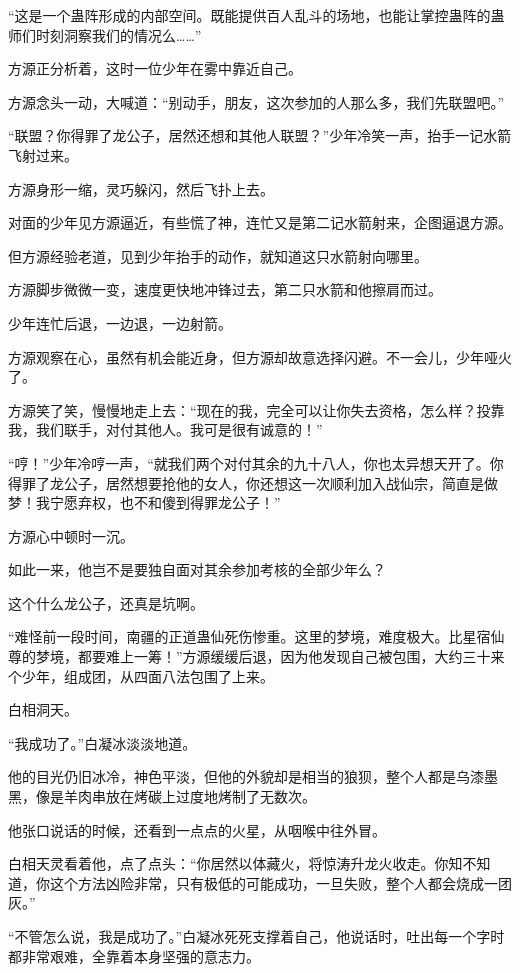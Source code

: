\begin{this_body}
“这是一个蛊阵形成的内部空间。既能提供百人乱斗的场地，也能让掌控蛊阵的蛊师们时刻洞察我们的情况么……”

方源正分析着，这时一位少年在雾中靠近自己。

方源念头一动，大喊道：“别动手，朋友，这次参加的人那么多，我们先联盟吧。”

“联盟？你得罪了龙公子，居然还想和其他人联盟？”少年冷笑一声，抬手一记水箭飞射过来。

方源身形一缩，灵巧躲闪，然后飞扑上去。

对面的少年见方源逼近，有些慌了神，连忙又是第二记水箭射来，企图逼退方源。

但方源经验老道，见到少年抬手的动作，就知道这只水箭射向哪里。

方源脚步微微一变，速度更快地冲锋过去，第二只水箭和他擦肩而过。

少年连忙后退，一边退，一边射箭。

方源观察在心，虽然有机会能近身，但方源却故意选择闪避。不一会儿，少年哑火了。

方源笑了笑，慢慢地走上去：“现在的我，完全可以让你失去资格，怎么样？投靠我，我们联手，对付其他人。我可是很有诚意的！”

“哼！”少年冷哼一声，“就我们两个对付其余的九十八人，你也太异想天开了。你得罪了龙公子，居然想要抢他的女人，你还想这一次顺利加入战仙宗，简直是做梦！我宁愿弃权，也不和傻到得罪龙公子！”

方源心中顿时一沉。

如此一来，他岂不是要独自面对其余参加考核的全部少年么？

这个什么龙公子，还真是坑啊。

“难怪前一段时间，南疆的正道蛊仙死伤惨重。这里的梦境，难度极大。比星宿仙尊的梦境，都要难上一筹！”方源缓缓后退，因为他发现自己被包围，大约三十来个少年，组成团，从四面八法包围了上来。

白相洞天。

“我成功了。”白凝冰淡淡地道。

他的目光仍旧冰冷，神色平淡，但他的外貌却是相当的狼狈，整个人都是乌漆墨黑，像是羊肉串放在烤碳上过度地烤制了无数次。

他张口说话的时候，还看到一点点的火星，从咽喉中往外冒。

白相天灵看着他，点了点头：“你居然以体藏火，将惊涛升龙火收走。你知不知道，你这个方法凶险非常，只有极低的可能成功，一旦失败，整个人都会烧成一团灰。”

“不管怎么说，我是成功了。”白凝冰死死支撑着自己，他说话时，吐出每一个字时都非常艰难，全靠着本身坚强的意志力。


\end{this_body}
